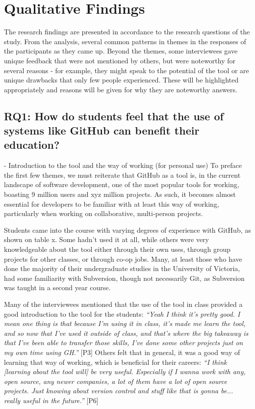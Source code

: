 
\section{Qualitative Findings}

The research findings are presented in accordance to the research questions of the study. From the analysis, several common patterns in themes in the responses of the participants as they came up. Beyond the themes, some interviewees gave unique feedback that were not mentioned by others, but were noteworthy for several reasons - for example, they might speak to the potential of the tool or are unique drawbacks that only few people experienced. These will be highlighted appropriately and reasons will be given for why they are noteworthy answers.


\subsection{RQ1: How do students feel that the use of systems like GitHub can benefit their education?}
- Introduction to the tool and the way of working (for personal use)
To preface the first few themes, we must reiterate that GitHub as a tool is, in the current landscape of software development, one of the most popular tools for working, boasting 9 million users and xyz million projects. As such, it becomes almost essential for developers to be familiar with at least this way of working, particularly when working on collaborative, multi-person projects.

Students came into the course with varying degrees of experience with GitHub, as shown on table x. Some hadn't used it at all, while others were very knowledgeable about the tool either through their own uses, through group projects for other classes, or through co-op jobs. Many, at least those who have done the majority of their undergraduate studies in the University of Victoria, had some familiarity with Subversion, though not necessarily Git, as Subversion was taught in a second year course.

Many of the interviewees mentioned that the use of the tool in class provided a good introduction to the tool for the students: \textit{``Yeah I think it's pretty good. I mean one thing is that because I'm using it in class, it's made me learn the tool, and so now that I've used it outside of class, and that's where the big takeaway is that I've been able to transfer those skills, I've done some other projects just on my own time using GH.''} [P3] Others felt that in general, it was a good way of learning that way of working, which is beneficial for their careers: \textit{``I think [learning about the tool will] be very useful. Especially if I wanna work with any, open source, any newer companies, a lot of them have a lot of open source projects. Just knowing about version control and stuff like that is gonna be... really useful in the future.''} [P6]

